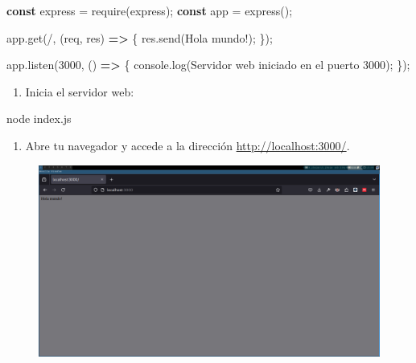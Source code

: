 \documentclass[
  a4paper,
  DIV=11,
  numbers=noendperiod,
  onepage,
  openany]{scrreprt}
\newenvironment{Shaded}{\begin{snugshade}}{\end{snugshade}}
\newcommand{\BuiltInTok}[1]{\textcolor[rgb]{0.00,0.23,0.31}{#1}}
\newcommand{\DecValTok}[1]{\textcolor[rgb]{0.68,0.00,0.00}{#1}}
\newcommand{\ExtensionTok}[1]{\textcolor[rgb]{0.00,0.23,0.31}{#1}}
\newcommand{\FunctionTok}[1]{\textcolor[rgb]{0.28,0.35,0.67}{#1}}
\newcommand{\KeywordTok}[1]{\textcolor[rgb]{0.00,0.23,0.31}{\textbf{#1}}}
\newcommand{\NormalTok}[1]{\textcolor[rgb]{0.00,0.23,0.31}{#1}}
\newcommand{\OperatorTok}[1]{\textcolor[rgb]{0.37,0.37,0.37}{#1}}
\newcommand{\PreprocessorTok}[1]{\textcolor[rgb]{0.68,0.00,0.00}{#1}}
\newcommand{\StringTok}[1]{\textcolor[rgb]{0.13,0.47,0.30}{#1}}
\providecommand{\tightlist}{%
  \setlength{\itemsep}{0pt}\setlength{\parskip}{0pt}}\usepackage{longtable,booktabs,array}
\begin{document}
\begin{tcolorbox}
\begin{Shaded}
\begin{Highlighting}[]
\KeywordTok{const}\NormalTok{ express }\OperatorTok{=} \PreprocessorTok{require}\NormalTok{(}\StringTok{\textquotesingle{}express\textquotesingle{}}\NormalTok{)}\OperatorTok{;}
\KeywordTok{const}\NormalTok{ app }\OperatorTok{=} \FunctionTok{express}\NormalTok{()}\OperatorTok{;}

\NormalTok{app}\OperatorTok{.}\FunctionTok{get}\NormalTok{(}\StringTok{\textquotesingle{}/\textquotesingle{}}\OperatorTok{,}\NormalTok{ (req}\OperatorTok{,}\NormalTok{ res) }\KeywordTok{=\textgreater{}}\NormalTok{ \{}
\NormalTok{  res}\OperatorTok{.}\FunctionTok{send}\NormalTok{(}\StringTok{\textquotesingle{}Hola mundo!\textquotesingle{}}\NormalTok{)}\OperatorTok{;}
\NormalTok{\})}\OperatorTok{;}

\NormalTok{app}\OperatorTok{.}\FunctionTok{listen}\NormalTok{(}\DecValTok{3000}\OperatorTok{,}\NormalTok{ () }\KeywordTok{=\textgreater{}}\NormalTok{ \{}
  \BuiltInTok{console}\OperatorTok{.}\FunctionTok{log}\NormalTok{(}\StringTok{\textquotesingle{}Servidor web iniciado en el puerto 3000\textquotesingle{}}\NormalTok{)}\OperatorTok{;}
\NormalTok{\})}\OperatorTok{;}
\end{Highlighting}
\end{Shaded}

\begin{enumerate}
\def\labelenumi{\arabic{enumi}.}
\setcounter{enumi}{4}
\tightlist
\item
  Inicia el servidor web:
\end{enumerate}

\begin{Shaded}
\begin{Highlighting}[]
\ExtensionTok{node}\NormalTok{ index.js}
\end{Highlighting}
\end{Shaded}

\begin{enumerate}
\def\labelenumi{\arabic{enumi}.}
\setcounter{enumi}{5}
\tightlist
\item
  Abre tu navegador y accede a la dirección
  \url{http://localhost:3000/}.
\end{enumerate}

\begin{figure}[H]

{\centering \includegraphics{images/app_express.png}

}
\end{figure}
\end{tcolorbox}
\end{document}
